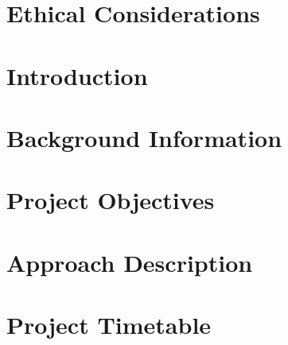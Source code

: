 \documentclass[12pt]{article}
\begin{document}
\pagebreak

\section*{Ethical Considerations}


\pagebreak

\tableofcontents

\pagebreak


\section{Introduction}


\section{Background Information}


\section{Project Objectives}


\section{Approach Description}


\section{Project Timetable}

\end{document}
